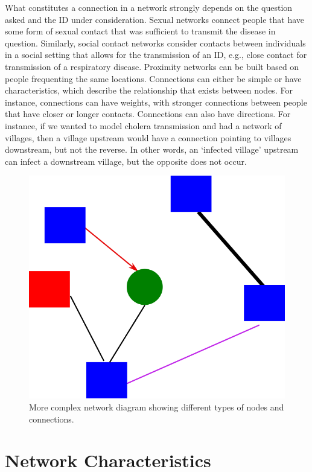 \documentclass[]{book}
\theoremstyle{definition}
\theoremstyle{definition}
\theoremstyle{definition}
\theoremstyle{remark}
\begin{document}
What constitutes a connection in a network strongly depends on the
question asked and the ID under consideration. Sexual networks connect
people that have some form of sexual contact that was sufficient to
transmit the disease in question. Similarly, social contact networks
consider contacts between individuals in a social setting that allows
for the transmission of an ID, e.g., close contact for transmission of a
respiratory disease. Proximity networks can be built based on people
frequenting the same locations. Connections can either be simple or have
characteristics, which describe the relationship that exists between
nodes. For instance, connections can have weights, with stronger
connections between people that have closer or longer contacts.
Connections can also have directions. For instance, if we wanted to
model cholera transmission and had a network of villages, then a village
upstream would have a connection pointing to villages downstream, but
not the reverse. In other words, an `infected village' upstream can
infect a downstream village, but the opposite does not occur.

\begin{figure}
\centering
\includegraphics{./images/complex-network-diagram.png}
\caption{More complex network diagram showing different types of nodes
and connections.}
\end{figure}

\section{Network Characteristics}\label{network-characteristics}
\end{document}
